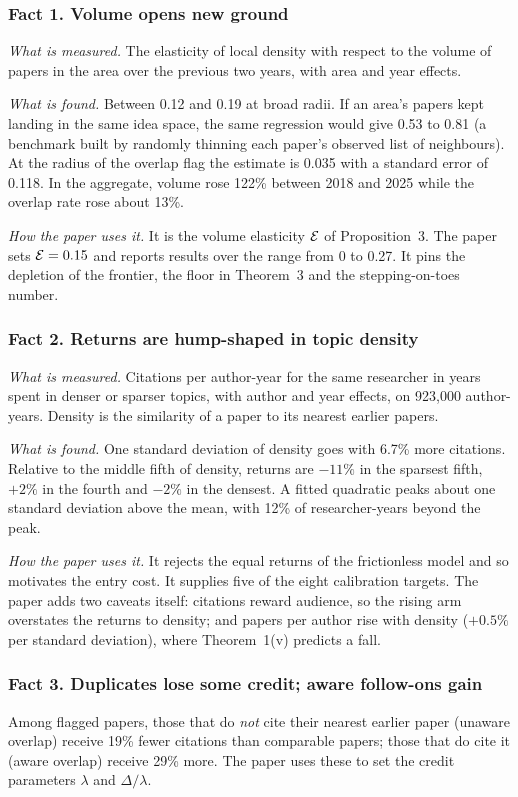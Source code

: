 \subsubsection{Fact 1. Volume opens new ground}
\emph{What is measured.} The elasticity of local density with respect to the volume of papers in the area over the previous two years, with area and year effects.

\emph{What is found.} Between 0.12 and 0.19 at broad radii. If an area's papers kept landing in the same idea space, the same regression would give 0.53 to 0.81 (a benchmark built by randomly thinning each paper's observed list of neighbours). At the radius of the overlap flag the estimate is 0.035 with a standard error of 0.118. In the aggregate, volume rose 122\% between 2018 and 2025 while the overlap rate rose about 13\%.

\emph{How the paper uses it.} It is the volume elasticity $\mathcal{E}$ of Proposition~3. The paper sets $\mathcal{E}=0.15$ and reports results over the range from 0 to 0.27. It pins the depletion of the frontier, the floor in Theorem~3 and the stepping-on-toes number.

\subsubsection{Fact 2. Returns are hump-shaped in topic density}
\emph{What is measured.} Citations per author-year for the same researcher in years spent in denser or sparser topics, with author and year effects, on 923,000 author-years. Density is the similarity of a paper to its nearest earlier papers.

\emph{What is found.} One standard deviation of density goes with 6.7\% more citations. Relative to the middle fifth of density, returns are $-11\%$ in the sparsest fifth, $+2\%$ in the fourth and $-2\%$ in the densest. A fitted quadratic peaks about one standard deviation above the mean, with 12\% of researcher-years beyond the peak.

\emph{How the paper uses it.} It rejects the equal returns of the frictionless model and so motivates the entry cost. It supplies five of the eight calibration targets. The paper adds two caveats itself: citations reward audience, so the rising arm overstates the returns to density; and papers per author rise with density ($+0.5\%$ per standard deviation), where Theorem~1(v) predicts a fall.

\subsubsection{Fact 3. Duplicates lose some credit; aware follow-ons gain}
Among flagged papers, those that do \emph{not} cite their nearest earlier paper (unaware overlap) receive 19\% fewer citations than comparable papers; those that do cite it (aware overlap) receive 29\% more. The paper uses these to set the credit parameters $\lambda$ and $\Delta/\lambda$.

